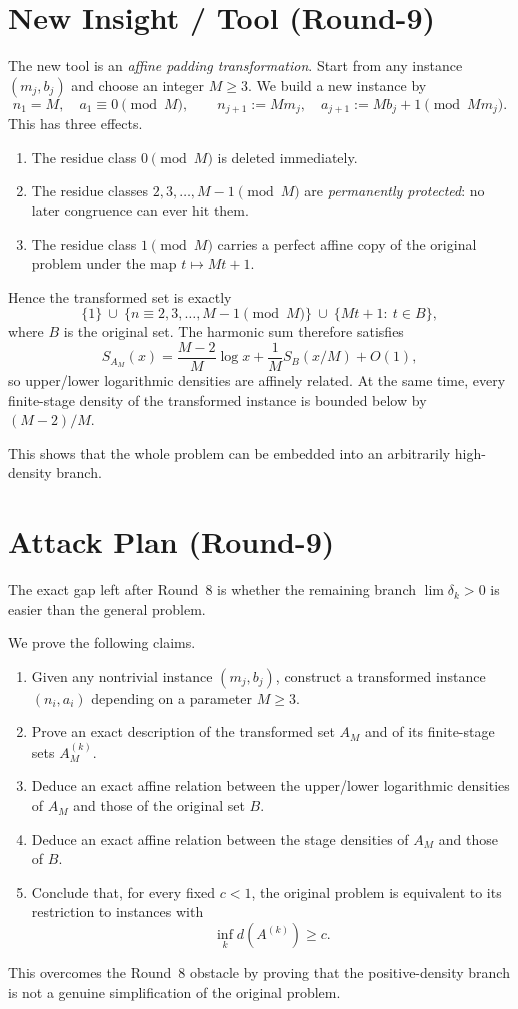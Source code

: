 \section{New Insight / Tool (Round-9)}
The new tool is an \emph{affine padding transformation}.  Start from any instance $(m_j,b_j)$ and choose an integer $M\ge 3$.  We build a new instance by
\[
n_1=M,\quad a_1\equiv 0\pmod M,
\qquad
n_{j+1}:=Mm_j,\quad a_{j+1}:=Mb_j+1 \pmod{Mm_j}.
\]
This has three effects.
\begin{enumerate}
\item The residue class $0\pmod M$ is deleted immediately.
\item The residue classes $2,3,\dots,M-1\pmod M$ are \emph{permanently protected}: no later congruence can ever hit them.
\item The residue class $1\pmod M$ carries a perfect affine copy of the original problem under the map $t\mapsto Mt+1$.
\end{enumerate}
Hence the transformed set is exactly
\[
\{1\}\ \cup\ \{n\equiv 2,3,\dots,M-1\pmod M\}\ \cup\ \{Mt+1:\ t\in B\},
\]
where $B$ is the original set.  The harmonic sum therefore satisfies
\[
S_{A_M}(x)=\frac{M-2}{M}\log x+\frac1M S_B(x/M)+O(1),
\]
so upper/lower logarithmic densities are affinely related.  At the same time, every finite-stage density of the transformed instance is bounded below by $(M-2)/M$.

This shows that the whole problem can be embedded into an arbitrarily high-density branch.

\section{Attack Plan (Round-9)}
The exact gap left after Round~8 is whether the remaining branch $\lim\delta_k>0$ is easier than the general problem.

We prove the following claims.
\begin{enumerate}
\item Given any nontrivial instance $(m_j,b_j)$, construct a transformed instance $(n_i,a_i)$ depending on a parameter $M\ge 3$.
\item Prove an exact description of the transformed set $A_M$ and of its finite-stage sets $A_M^{(k)}$.
\item Deduce an exact affine relation between the upper/lower logarithmic densities of $A_M$ and those of the original set $B$.
\item Deduce an exact affine relation between the stage densities of $A_M$ and those of $B$.
\item Conclude that, for every fixed $c<1$, the original problem is equivalent to its restriction to instances with
\[
\inf_k d(A^{(k)})\ge c.
\]
\end{enumerate}
This overcomes the Round~8 obstacle by proving that the positive-density branch is not a genuine simplification of the original problem.

